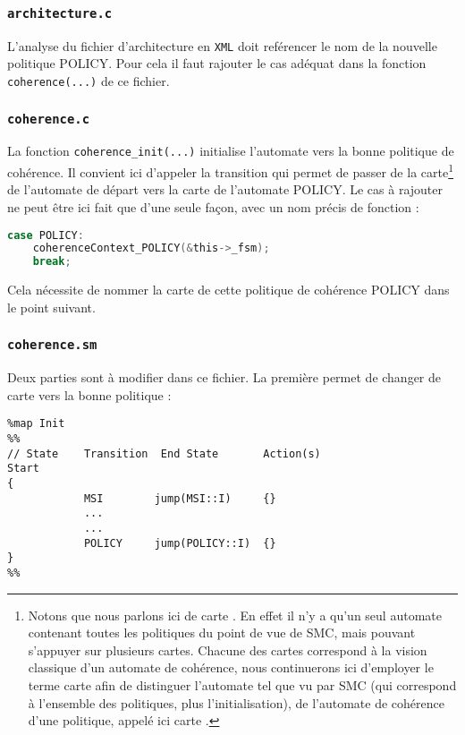 \subsubsection{\texttt{architecture.c}}

L'analyse du fichier d'architecture en \texttt{XML} doit reférencer le nom de la nouvelle politique POLICY. Pour cela il faut rajouter le cas adéquat dans la fonction \texttt{coherence(...)} de ce fichier.

\subsubsection{\texttt{coherence.c}}

La fonction \texttt{coherence\_init(...)} initialise l'automate vers la bonne politique de cohérence. Il convient ici d'appeler la transition qui permet de passer de la carte\footnote{Notons que nous parlons ici de \og carte \fg. En effet il n'y a qu'un seul automate contenant toutes les politiques du point de vue de \textsf{SMC}, mais pouvant s'appuyer sur plusieurs cartes. Chacune des cartes correspond à la vision classique d'un automate de cohérence, nous continuerons ici d'employer le terme \og carte \fg afin de distinguer l'automate tel que vu par \textsf{SMC} (qui correspond à l'ensemble des politiques, plus l'initialisation), de l'automate de cohérence d'une politique, appelé ici \og carte \fg.} de l'automate de départ vers la carte de l'automate POLICY. Le cas à rajouter ne peut être ici fait que d'une seule façon, avec un nom précis de fonction :
\begin{framed}
\begin{lstlisting}[frame=none,language=C]
  case POLICY:
    coherenceContext_POLICY(&this->_fsm);
    break;
\end{lstlisting}
\end{framed}
Cela nécessite de nommer la carte de cette politique de cohérence POLICY dans le point suivant.

\subsubsection{\texttt{coherence.sm}}


Deux parties sont à modifier dans ce fichier. La première permet de changer de carte vers la bonne politique :
\begin{framed}
\begin{verbatim}
%map Init
%%
// State    Transition  End State       Action(s)
Start
{
            MSI        jump(MSI::I)     {}
            ...
            ...
            POLICY     jump(POLICY::I)  {}
}
%%
\end{verbatim}
\end{framed}

